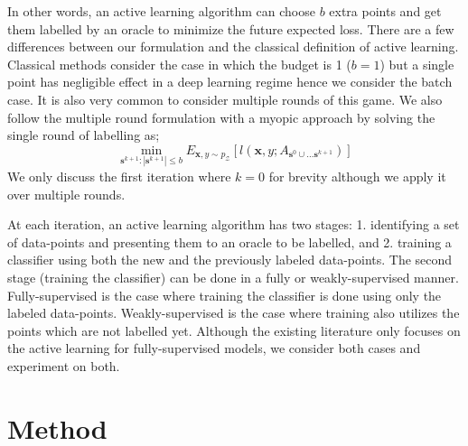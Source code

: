 \documentclass{article} %
\begin{document}
In other words, an active learning algorithm can choose $b$ extra points and get them labelled by an oracle to minimize
the future expected loss. There are a few differences between our formulation and the classical definition of active
learning. Classical methods consider the case in which the budget is 1 ($b=1$) but a single point has negligible effect
in a deep learning regime hence we consider the batch case. It is also very common to consider multiple rounds of this
game. %
We also follow the multiple round formulation with a myopic approach by solving the single round of labelling as;
\begin{equation} \min_{\mathbf{s}^{k+1} : |\mathbf{s}^{k+1}| \leq b} E_{\mathbf{x},y \sim p_\mathcal{Z}}
[l(\mathbf{x},y;A_{\mathbf{s}^{0} \cup \ldots  \mathbf{s}^{k+1}})] \end{equation}
We only discuss the first iteration where $k=0$ for brevity although we apply it over multiple rounds. 

At each iteration, an active learning algorithm has two stages: 1. identifying a set of data-points and presenting them
to an oracle to be labelled, and 2. training a classifier using both the new and the previously labeled data-points. The
second stage (training the classifier) can be done in a fully or weakly-supervised manner. Fully-supervised is the case
where training the classifier is done using only the labeled data-points. Weakly-supervised is the case where training
also utilizes the points which are not labelled yet. Although the existing literature only focuses on the active
learning for fully-supervised models, we consider both cases and experiment on both. 

\section{Method} 
\end{document}
